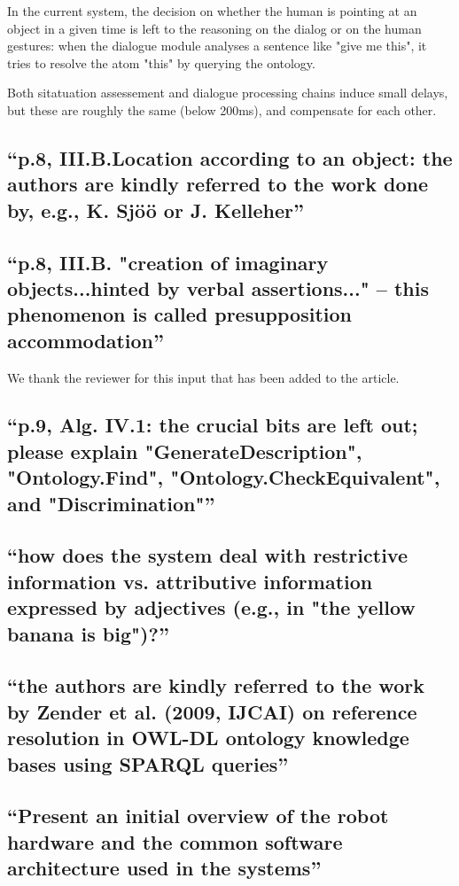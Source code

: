 \documentclass{article}
\begin{document}
In the current system, the decision on whether the human is pointing at an 
object in a given time is left to the reasoning on the dialog or on the human gestures:
when the dialogue module analyses a sentence like "give me this", it tries to
resolve the atom "this" by querying the ontology.

Both sitatuation assessement and dialogue processing chains induce 
small delays, but these are roughly the same (below 200ms), and 
compensate for each other.

\subsection{``p.8, III.B.Location according to an object: the authors are
kindly referred to the work done by, e.g., K. Sjöö or J. Kelleher''}

\subsection{``p.8, III.B. "creation of imaginary objects...hinted by verbal
assertions..." -- this phenomenon is called presupposition accommodation''}

We thank the reviewer for this input that has been added to the article.

\subsection{``p.9, Alg. IV.1: the crucial bits are left out; please explain
"GenerateDescription", "Ontology.Find", "Ontology.CheckEquivalent", and
"Discrimination"''}

\subsection{``how does the system deal with restrictive information vs.
attributive information expressed by adjectives (e.g., in "the yellow banana is
big")?''}

\subsection{``the authors are kindly referred to the work by Zender et al.
(2009, IJCAI) on reference resolution in OWL-DL ontology knowledge bases using
SPARQL queries''}

\subsection{``Present an initial overview of the
robot hardware and the common software architecture used in the systems''}
\end{document}
